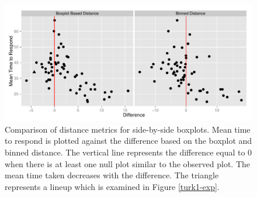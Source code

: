 \documentclass[12]{article}
\begin{document}

\begin{figure}[hbtp]
\centering
\includegraphics[scale=0.75]{turk1-mtime-box-bin.pdf}
	\vspace{-.1in}
\caption[Optional caption for list of figures]{Comparison of distance metrics for side-by-side boxplots. Mean time to respond is plotted against the difference based on the boxplot and binned distance. The vertical line represents the difference equal to 0 when there is at least one null plot similar to the observed plot. The mean time taken decreases with the difference. The triangle represents a lineup which is examined in Figure \ref{turk1-exp}. }
\label{turk1-mtime}
\end{figure}
\end{document}
